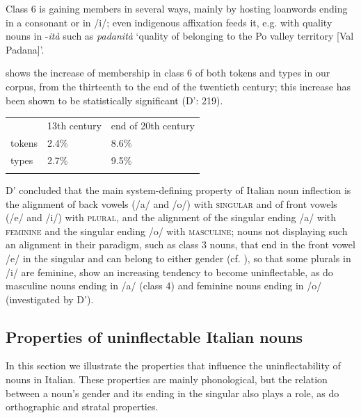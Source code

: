 \documentclass[output=paper]{langscibook}
\begin{document}
Class 6 is gaining members in several ways, mainly by hosting loanwords ending in a consonant or in /i/; even indigenous affixation feeds it, e.g. with quality nouns in \nobreakdash-\textit{ità} such as \textit{padanità} ‘quality of belonging to the Po valley territory [Val Padana]’.

 shows the increase of membership in class 6 of both tokens and types in our corpus, from the thirteenth to the end of the twentieth century; this increase has been shown to be statistically significant (D’\citealt{AchilleThornton2003}: 219).

\begin{table}
\caption{Percentage of types and tokens of nouns in class 6 in the corpus}
\label{tab:key:8}
\end{table}


\begin{tabularx}{\textwidth}{XXX}

\lsptoprule

~ & 13th century & end of 20th century\\
tokens & 2.4\% & 8.6\%\\
types & 2.7\% & 9.5\%\\
\lspbottomrule
\end{tabularx}
D’\citet{AchilleThornton2003} concluded that the main system-defining property of Italian noun inflection is the alignment of back vowels (/a/ and /o/) with \textsc{singular} and of front vowels (/e/ and /i/) with \textsc{plural}, and the alignment of the singular ending /a/ with \textsc{feminine} and the singular ending /o/ with \textsc{masculine}; nouns not displaying such an alignment in their paradigm, such as class 3 nouns, that end in the front vowel /e/ in the singular and can belong to either gender (cf. ), so that some plurals in /i/ are feminine, show an increasing tendency to become uninflectable, as do masculine nouns ending in /a/ (class 4) and feminine nouns ending in /o/ (investigated by D’\citealt{AchilleThornton2008}).

\subsection{Properties of uninflectable Italian nouns}

In this section we illustrate the properties that influence the uninflectability of nouns in Italian. These properties are mainly phonological, but the relation between a noun’s gender and its ending in the singular also plays a role, as do orthographic and stratal properties. 
\end{document}
